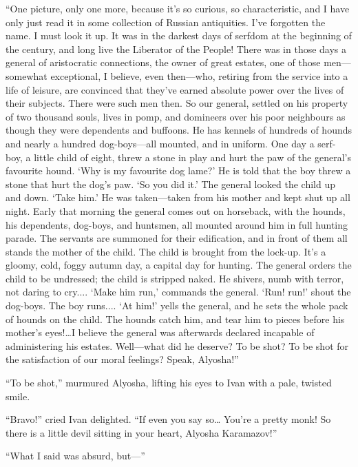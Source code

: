 ``One picture, only one more, because it's so curious, so
characteristic, and I have only just read it in some collection of
Russian antiquities. I've forgotten the name. I must look it up. It
was in the darkest days of serfdom at the beginning of the century,
and long live the Liberator of the People! There was in those days a
general of aristocratic connections, the owner of great estates, one
of those men---some\-what exceptional, I believe, even then---who,
retiring from the service into a life of leisure, are convinced that
they've earned absolute power over the lives of their subjects. There
were such men then. So our general, settled on his property of two
thousand souls, lives in pomp, and domineers over his poor neighbours
as though they were dependents and buffoons. He has kennels of
hundreds of hounds and nearly a hundred dog-boys---all mounted, and in
uniform. One day a serf-boy, a little child of eight, threw a stone in
play and hurt the paw of the general's favourite hound. `Why is my
favourite dog lame?' He is told that the boy threw a stone that hurt
the dog's paw. `So you did it.' The general looked the child up and
down. `Take him.' He was tak\-en---tak\-en from his mother and kept
shut up all night. Early that morning the general comes out on
horseback, with the hounds, his dependents, dog-boys, and huntsmen,
all mounted around him in full hunting parade. The servants are
summoned for their edification, and in front of them all stands the
mother of the child. The child is brought from the lock-up. It's a
gloomy, cold, foggy autumn day, a capital day for hunting. The general
orders the child to be undressed; the child is stripped naked. He
shivers, numb with terror, not daring to cry.... `Make him run,'
commands the general. `Run! run!' shout the dog-boys. The boy runs....
`At him!' yells the general, and he sets the whole pack of hounds on
the child. The hounds catch him, and tear him to pieces before his
mother's eyes!\ldots I believe the general was afterwards declared
incapable of administering his estates. Well---what did he deserve? To
be shot? To be shot for the satisfaction of our moral feelings? Speak,
Alyosha!''

``To be shot,'' murmured Alyosha, lifting his eyes to Ivan with a
pale, twisted smile.

``Bravo!'' cried Ivan delighted. ``If even you say so\ldots
You're a pretty monk! So there is a little devil sitting in your
heart, Alyosha Karamazov!''

``What I said was absurd, but---''

